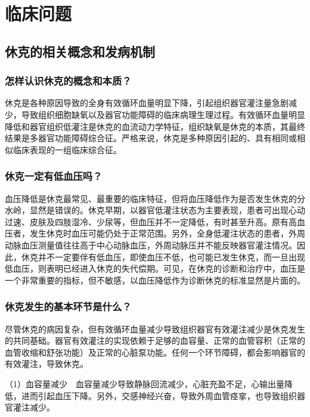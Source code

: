 \section{临床问题}

\subsection{休克的相关概念和发病机制}

\subsubsection{怎样认识休克的概念和本质？}

休克是各种原因导致的全身有效循环血量明显下降，引起组织器官灌注量急剧减少，导致组织细胞缺氧以及器官功能障碍的临床病理生理过程。有效循环血量明显降低和器官组织低灌注是休克的血流动力学特征，组织缺氧是休克的本质，其最终结果是多器官功能障碍综合征。严格来说，休克是多种原因引起的、具有相同或相似临床表现的一组临床综合征。

\subsubsection{休克一定有低血压吗？}

血压降低是休克最常见、最重要的临床特征，但将血压降低作为是否发生休克的分水岭，显然是错误的。休克早期，以器官低灌注状态为主要表现，患者可出现心动过速、皮肤及四肢湿冷、少尿等，但血压并不一定降低，有时甚至升高。原有高血压者，发生休克时血压可能仍处于正常范围。另外，全身低灌注状态的患者，外周动脉血压测量值往往高于中心动脉血压，外周动脉压并不能反映器官灌注情况。因此，休克并不一定要伴有低血压，即使血压不低，也可能已发生休克，而一旦出现低血压，则表明已经进入休克的失代偿期。可见，在休克的诊断和治疗中，血压是一个非常重要的指标，但不敏感，以血压降低作为诊断休克的标准显然是片面的。

\subsubsection{休克发生的基本环节是什么？}

尽管休克的病因复杂，但有效循环血量减少导致组织器官有效灌注减少是休克发生的共同基础。器官有效灌注的实现依赖于足够的血容量、正常的血管容积（正常的血管收缩和舒张功能）及正常的心脏泵功能。任何一个环节障碍，都会影响器官的有效灌注，导致休克。

（1）血容量减少　血容量减少导致静脉回流减少，心脏充盈不足，心输出量降低，进而引起血压下降。另外，交感神经兴奋，导致外周血管痉挛，也导致组织器官灌注减少。

